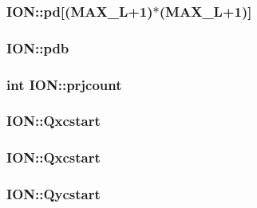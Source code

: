 \hypertarget{struct_i_o_n_a68eb3a094587f4f525585bfe45a5c2e2}{
\subsubsection[{pd}]{ I\-O\-N\-::pd\mbox{[}({\bf M\-A\-X\-\_\-\-L}+1)$\ast$({\bf M\-A\-X\-\_\-\-L}+1)\mbox{]}}}\label{struct_i_o_n_a68eb3a094587f4f525585bfe45a5c2e2}
\hypertarget{struct_i_o_n_a73d7a10366e72d9e9d2eb62d0bcfa698}{
\subsubsection[{pdb}]{ I\-O\-N\-::pdb}}\label{struct_i_o_n_a73d7a10366e72d9e9d2eb62d0bcfa698}
\hypertarget{struct_i_o_n_ad78c604b2cab2159e22be5fecc9909ac}{
\subsubsection[{prjcount}]{\setlength{\rightskip}{0pt plus 5cm}int I\-O\-N\-::prjcount}}\label{struct_i_o_n_ad78c604b2cab2159e22be5fecc9909ac}
\hypertarget{struct_i_o_n_a7db34dc67d3de05fcaf2d716819e6ed5}{
\subsubsection[{Qxcstart}]{ I\-O\-N\-::\-Qxcstart}}\label{struct_i_o_n_a7db34dc67d3de05fcaf2d716819e6ed5}
\hypertarget{struct_i_o_n_a4b7d076b25807b074fafc019ed1ef6be}{
\subsubsection[{Qxcstart}]{ I\-O\-N\-::\-Qxcstart}}\label{struct_i_o_n_a4b7d076b25807b074fafc019ed1ef6be}
\hypertarget{struct_i_o_n_a87cc75d0bad5beaa4efb321d0f54246e}{
\subsubsection[{Qycstart}]{ I\-O\-N\-::\-Qycstart}}\label{struct_i_o_n_a87cc75d0bad5beaa4efb321d0f54246e}
